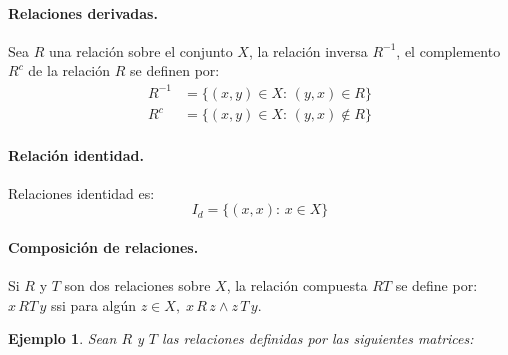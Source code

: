 \documentclass[a5paper,doc,10pt,noapacite]{apa6}
\newtheorem{ejem}{Ejemplo}
\begin{document}
{{\paragraph{Relaciones derivadas.}

Sea \(R\) una relación sobre el conjunto \(X\), la relación inversa \(R^{-1}\), el complemento \(R^{c}\) de la relación \(R\) se definen por:
\begin{align*}
    R^{-1} &= \big\{(x,y) \in X : \,(y,x) \in R \big\} \\
    R^{c} &= \big\{(x,y) \in X : \, (y,x) \not \in R\big\} 
\end{align*}

\paragraph{Relación identidad.}

Relaciones identidad es:
\[
	I_d = \big\{ (x,x) : \, x \in X \big\}
\]

\vspace{-1\baselineskip}
\paragraph{Composición de relaciones.}

Si \(R\) y \(T\) son dos relaciones sobre \(X\), la relación compuesta \(RT\) se define por: \(x \, RT \, y\) ssi para algún \(z \in X, \; x \, R\, z \wedge z \, T\, y\).

%
\begin{ejem}

Sean \(R\) y \(T\) las relaciones definidas por las siguientes matrices:


\end{ejem}}}
\end{document}
